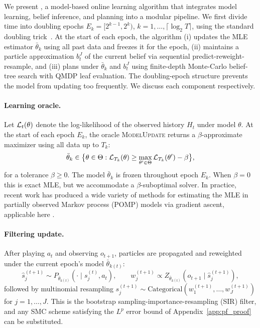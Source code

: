 We present , a model-based online learning algorithm that integrates model learning, belief inference, and planning into a modular pipeline. We first divide time into doubling epochs $E_k=[2^{k-1},2^k)$, $k=1,\ldots,\lceil\log_2 T\rceil$, using the standard doubling trick~\citep{besson2018doubling}. At the start of each epoch, the algorithm (i) updates the MLE estimator $\bar\theta_k$ using all past data and freezes it for the epoch, (ii) maintains a particle approximation $b_t^J$ of the current belief via sequential predict-reweight-resample, and (iii) plans under $\bar{\theta}_k$ and $b_t^J$ using finite-depth Monte-Carlo belief-tree search with QMDP leaf evaluation. The doubling-epoch structure prevents the model from updating too frequently.  We discuss each component respectively.

\paragraph{Learning oracle.} Let ${\mathcal{L}}_t(\theta)$ denote the log-likelihood of the observed history $H_t$ under model $\theta$. At the start of each epoch $E_k$, the oracle \textsc{ModelUpdate} returns a $\beta$-approximate maximizer using all data up to $T_k$:
\begin{equation}\label{eq:beta_mle}
\bar\theta_k\in\bigl\{\theta\in\Theta:{\mathcal{L}}_{T_k}(\theta)\ge \max_{\theta'\in\Theta}{\mathcal{L}}_{T_k}(\theta')-\beta\bigr\},
\end{equation}
for a tolerance $\beta\ge 0$. The model $\bar\theta_k$ is frozen throughout epoch $E_k$. When $\beta=0$ this is exact MLE, but we accommodate a $\beta$-suboptimal solver. In practice, recent work has produced a wide variety of methods for estimating the MLE in partially observed Markov process (POMP) models via gradient ascent, applicable here \citep{naesseth18, tan2024accelerated, chen2025self, ionides15, corenflos21}.

\paragraph{Filtering update.} After playing $a_t$ and observing $o_{t+1}$, particles are propagated and reweighted under the current epoch's model $\bar\theta_{k(t)}$:
\begin{equation}\label{eq:pf_predict_weight}
\hat s^{(t+1)}_j \sim P_{\bar\theta_{k(t)}}(\cdot \mid s^{(t)}_j,a_t),
\qquad
w^{(t+1)}_j \propto Z_{\bar\theta_{k(t)}}(o_{t+1}\mid \hat s^{(t+1)}_j),
\end{equation}
followed by multinomial resampling
$s^{(t+1)}_j \sim \mathrm{Categorical}(w^{(t+1)}_1,\ldots,w^{(t+1)}_J)$ for $j=1,\ldots,J$.
This is the bootstrap sampling-importance-resampling (SIR) filter, and any SMC scheme satisfying the $L^p$ error bound of Appendix~\ref{app:pf_proof} can be substituted.

